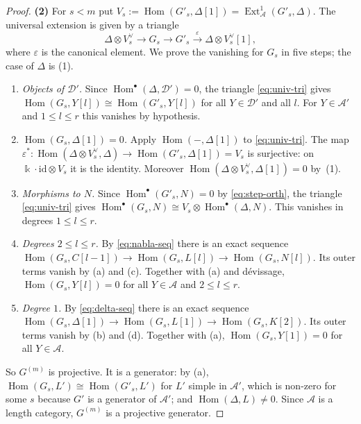 \documentclass[11pt,reqno]{amsart}
\theoremstyle{plain}
\theoremstyle{definition}
\theoremstyle{remark}
\newcommand{\kk}{\Bbbk}
\DeclareMathOperator{\Hom}{Hom}
\DeclareMathOperator{\Ext}{Ext}
\newcommand{\cD}{\mathcal{D}}
\newcommand{\cA}{\mathcal{A}}
\begin{document}
\begin{proof}
\textbf{(2)} For $s<m$ put $V_s:=\Hom(G'_s,\Delta[1])=\Ext^1_\cA(G'_s,\Delta)$. The universal extension is given by a triangle
\begin{equation}\label{eq:univ-tri}
\Delta\otimes V_s^\vee\to G_s\to G'_s\xrightarrow{\ \varepsilon\ }\Delta\otimes V_s^\vee[1],
\end{equation}
where $\varepsilon$ is the canonical element. We prove the vanishing for $G_s$ in five steps; the case of $\Delta$ is (1).
\begin{enumerate}[label=(\alph*)]
\item \emph{Objects of $\cD'$.} Since $\Hom^\bullet(\Delta,\cD')=0$, the triangle \eqref{eq:univ-tri} gives $\Hom(G_s,Y[l])\cong\Hom(G'_s,Y[l])$ for all $Y\in\cD'$ and all $l$. For $Y\in\cA'$ and $1\le l\le r$ this vanishes by hypothesis.
\item \emph{$\Hom(G_s,\Delta[1])=0$.} Apply $\Hom(-,\Delta[1])$ to \eqref{eq:univ-tri}. The map $\varepsilon^*\colon\Hom(\Delta\otimes V_s^\vee,\Delta)\to\Hom(G'_s,\Delta[1])=V_s$ is surjective: on $\kk\cdot\mathrm{id}\otimes V_s$ it is the identity. Moreover $\Hom(\Delta\otimes V_s^\vee,\Delta[1])=0$ by~(1).
\item \emph{Morphisms to $N$.} Since $\Hom^\bullet(G'_s,N)=0$ by \eqref{eq:step-orth}, the triangle \eqref{eq:univ-tri} gives $\Hom^\bullet(G_s,N)\cong V_s\otimes\Hom^\bullet(\Delta,N)$. This vanishes in degrees $1\le l\le r$.
\item \emph{Degrees $2\le l\le r$.} By \eqref{eq:nabla-seq} there is an exact sequence $\Hom(G_s,C[l-1])\to\Hom(G_s,L[l])\to\Hom(G_s,N[l])$. Its outer terms vanish by (a) and (c). Together with (a) and d\'evissage, $\Hom(G_s,Y[l])=0$ for all $Y\in\cA$ and $2\le l\le r$.
\item \emph{Degree $1$.} By \eqref{eq:delta-seq} there is an exact sequence $\Hom(G_s,\Delta[1])\to\Hom(G_s,L[1])\to\Hom(G_s,K[2])$. Its outer terms vanish by (b) and (d). Together with (a), $\Hom(G_s,Y[1])=0$ for all $Y\in\cA$.
\end{enumerate}
So $G^{(m)}$ is projective. It is a generator: by (a), $\Hom(G_s,L')\cong\Hom(G'_s,L')$ for $L'$ simple in $\cA'$, which is non-zero for some $s$ because $G'$ is a generator of $\cA'$; and $\Hom(\Delta,L)\ne0$. Since $\cA$ is a length category, $G^{(m)}$ is a projective generator.


\end{proof}
\end{document}

